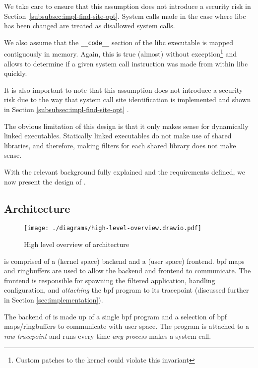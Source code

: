 We take care to ensure that this assumption does not introduce a
security risk in Section~\ref{subsubsec:impl-find-site-opt}. 
System calls made in the case where \ac{libc} has been changed are
treated as disallowed system calls.

We also assume that the \texttt{\_\_code\_\_} section of the \ac{libc}
executable is mapped contiguously in memory. Again, this is
true (almost) without exception\footnote{Custom patches to the kernel could
violate this invariant} \cite{glibc-dl-map-segments-h} and allows \af to determine if a given system 
call instruction was made from within \ac{libc} quickly.

It is also important to note that this assumption does not introduce a security
risk due to the way that system call site identification is implemented and shown in
Section \ref{subsubsec:impl-find-site-opt} .

The obvious limitation of this design is that it only makes sense for
dynamically linked executables. Statically linked executables do not make use of
shared libraries, and therefore, making filters for each shared library does not
make sense.

With the relevant background fully explained and the requirements defined, we
now present the design of \af. 

\subsection{Architecture} \label{subsec:arch}

\begin{figure}[ht]
    \centering
    \texttt{[image: ./diagrams/high-level-overview.drawio.pdf]} 
    \caption{High level overview of \afg architecture}
    \label{fig:arch-overview}
\end{figure}

\af is comprised of a (kernel space) backend and a (user space) frontend.
\ac{bpf} maps and ringbuffers are used to allow the backend and frontend to
communicate. The frontend is responsible for spawning the filtered application,
handling configuration, and \textit{attaching} the \ac{bpf} program to its
tracepoint (discussed further in Section \ref{sec:implementation}).

The backend of \af is made up of a single \ac{bpf} program and a selection of \ac{bpf}
maps/ringbuffers to communicate with user space.
The program is attached to a \textit{raw tracepoint} and runs every time
\textit{any process} makes a system call.

